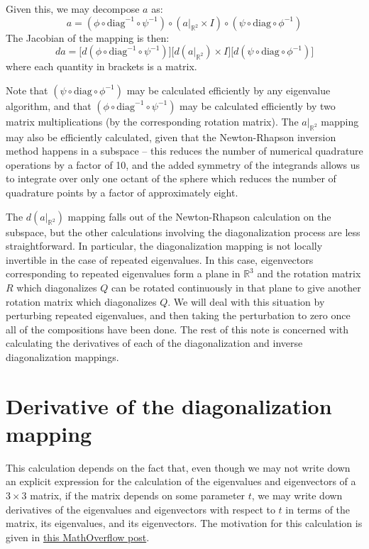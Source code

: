 \documentclass[reqno]{article}
\begin{document}
\noindent
Given this, we may decompose $a$ as:
\begin{equation}
    a
    =
    (\phi \circ \text{diag}^{-1} \circ \psi^{-1}) \circ
    (a|_{\mathbb{R}^2} \times I) \circ
    (\psi \circ \text{diag} \circ \phi^{-1})
\end{equation}
The Jacobian of the mapping is then:
\begin{equation}
    d a
    =
    \bigl[ d(\phi \circ \text{diag}^{-1} \circ \psi^{-1}) \bigr]
    \bigl[ d\left(a|_{\mathbb{R}^2}\right) \times I \bigr]
    \bigl[ d(\psi \circ \text{diag} \circ \phi^{-1}) \bigr]
\end{equation}
where each quantity in brackets is a matrix.

Note that $(\psi \circ \text{diag} \circ \phi^{-1})$ may be calculated efficiently by any eigenvalue algorithm, and that $(\phi \circ \text{diag}^{-1} \circ \psi^{-1})$ may be calculated efficiently by two matrix multiplications (by the corresponding rotation matrix).
The $a|_{\mathbb{R}^2}$ mapping may also be efficiently calculated, given that the Newton-Rhapson inversion method happens in a subspace -- this reduces the number of numerical quadrature operations by a factor of 10, and the added symmetry of the integrands allows us to integrate over only one octant of the sphere which reduces the number of quadrature points by a factor of approximately eight.

The $d\left(a|_{\mathbb{R}^2}\right)$ mapping falls out of the Newton-Rhapson calculation on the subspace, but the other calculations involving the diagonalization process are less straightforward.
In particular, the diagonalization mapping is not locally invertible in the case of repeated eigenvalues.
In this case, eigenvectors corresponding to repeated eigenvalues form a plane in $\mathbb{R}^3$ and the rotation matrix $R$ which diagonalizes $Q$ can be rotated continuously in that plane to give another rotation matrix which diagonalizes $Q$.
We will deal with this situation by perturbing repeated eigenvalues, and then taking the perturbation to zero once all of the compositions have been done.
The rest of this note is concerned with calculating the derivatives of each of the diagonalization and inverse diagonalization mappings.

\section{Derivative of the diagonalization mapping}
This calculation depends on the fact that, even though we may not write down an explicit expression for the calculation of the eigenvalues and eigenvectors of a $3\times 3$ matrix, if the matrix depends on some parameter $t$, we may write down derivatives of the eigenvalues and eigenvectors with respect to $t$ in terms of the matrix, its eigenvalues, and its eigenvectors.
The motivation for this calculation is given in \href{https://mathoverflow.net/q/229425}{this MathOverflow post}.
\end{document}
